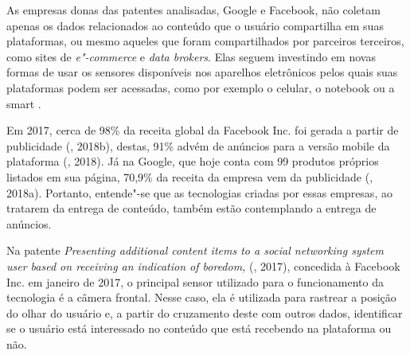 As empresas donas das patentes analisadas, Google e Facebook, não
coletam apenas os dados relacionados ao conteúdo que o usuário
compartilha em suas plataformas, ou mesmo aqueles que foram
compartilhados por parceiros terceiros, como sites de \emph{e"-commerce}
e \emph{data brokers}. Elas seguem investindo em novas formas de usar os
sensores disponíveis nos aparelhos eletrônicos pelos quais suas
plataformas podem ser acessadas, como por exemplo o celular, o notebook
ou a smart .

Em 2017, cerca de 98\% da receita global da Facebook Inc. foi gerada a
partir de publicidade (, 2018b), destas, 91\% advém de anúncios
para a versão mobile da plataforma (, 2018). Já na Google, que
hoje conta com 99 produtos próprios listados em sua página, 70,9\% da
receita da empresa vem da publicidade (, 2018a). Portanto,
entende"-se que as tecnologias criadas por essas empresas, ao tratarem da
entrega de conteúdo, também estão contemplando a entrega de anúncios.

Na patente \emph{Presenting additional content items to a social
networking system user based on receiving an indication of boredom,}
 (, 2017), concedida à Facebook Inc. em janeiro de
2017, o principal sensor utilizado para o funcionamento da tecnologia é
a câmera frontal. Nesse caso, ela é utilizada para rastrear a posição do
olhar do usuário e, a partir do cruzamento deste com outros dados,
identificar se o usuário está interessado no conteúdo que está recebendo
na plataforma ou não.


